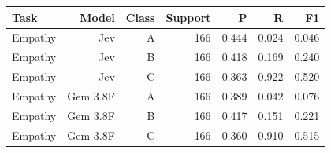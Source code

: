 \begin{tabular}{lrrrrrr}
\toprule
Task & Model & Class & Support & P & R & F1 \\
\midrule
Empathy & Jev & A & 166 & 0.444 & 0.024 & 0.046 \\
Empathy & Jev & B & 166 & 0.418 & 0.169 & 0.240 \\
Empathy & Jev & C & 166 & 0.363 & 0.922 & 0.520 \\
Empathy & Gem 3.8F & A & 166 & 0.389 & 0.042 & 0.076 \\
Empathy & Gem 3.8F & B & 166 & 0.417 & 0.151 & 0.221 \\
Empathy & Gem 3.8F & C & 166 & 0.360 & 0.910 & 0.515 \\
\bottomrule
\end{tabular}
